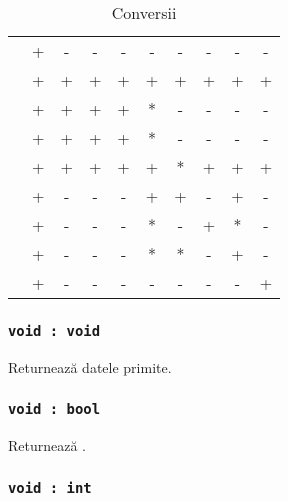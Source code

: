 \begin{table}[htb]
	\caption{Conversii}
	\label{castingtable}
	\begin{tabular}{|l|c|c|c|c|c|c|c|c|c|}
		\hline
		          & \void & \bool & \integer & \double & \str & \listtype & \object & \set & \element \\ \hline
		\void     & +     & -     & -        & -       & -    & -         & -       & -    & -        \\ \hline
		\bool     & +     & +     & +        & +       & +    & +         & +       & +    & +        \\ \hline
		\integer  & +     & +     & +        & +       & *    & -         & -       & -    & -        \\ \hline
		\double   & +     & +     & +        & +       & *    & -         & -       & -    & -        \\ \hline
		\str      & +     & +     & +        & +       & +    & *         & +       & +    & +        \\ \hline
		\listtype & +     & -     & -        & -       & +    & +         & -       & +    & -        \\ \hline
		\object   & +     & -     & -        & -       & *    & -         & +       & *    & -        \\ \hline
		\set      & +     & -     & -        & -       & *    & *         & -       & +    & -        \\ \hline
		\element  & +     & -     & -        & -       & -    & -         & -       & -    & +        \\ \hline
	\end{tabular}
\end{table}

\subsubsection{\texttt{void : void}}

Returnează datele primite.

\subsubsection{\texttt{void : bool}}

Returnează \false.

\subsubsection{\texttt{void : int}}

